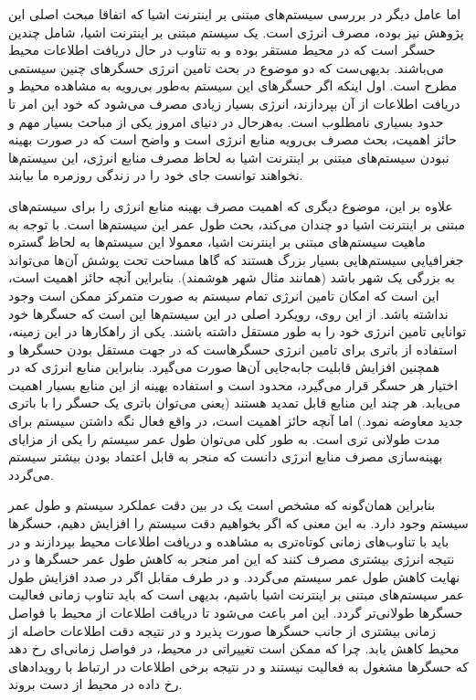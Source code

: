 \par
اما عامل دیگر در بررسی سیستم‌های مبتنی بر اینترنت اشیا که اتفاقا مبحث اصلی این پژوهش نیز بوده، مصرف انرژی است. یک سیستم مبتنی بر اینترنت اشیا، شامل چندین حسگر است که در محیط مستقر بوده و به تناوب در حال دریافت اطلاعات محیط می‌باشند. بدیهی‌ست که دو موضوع در بحث تامین انرژی حسگرهای چنین سیستمی مطرح است. اول اینکه اگر حسگرهای این سیستم به‌طور بی‌رویه به مشاهده محیط و دریافت اطلاعات از آن بپردازند، انرژی بسیار زیادی مصرف می‌شود که خود این امر تا حدود بسیاری نامطلوب است. به‌هرحال در دنیای امروز یکی از مباحث بسیار مهم و حائز اهمیت، بحث مصرف بی‌رویه منابع انرژی است و واضح است که در صورت بهینه نبودن سیستم‌های مبتنی بر اینترنت اشیا به لحاظ مصرف منابع انرژی، این سیستم‌ها نخواهند توانست جای خود را در زندگی روزمره ما بیابند.

\par
علاوه بر این، موضوع دیگری که اهمیت مصرف بهینه منابع انرژی را برای سیستم‌های مبتنی بر اینترنت اشیا دو چندان می‌کند، بحث طول عمر این سیستم‌ها است. با توجه به ماهیت سیستم‌های مبتنی بر اینترنت اشیا، معمولا این سیستم‌ها به لحاظ گستره جغرافیایی سیستم‌هایی بسیار بزرگ هستند که گاها مساحت تحت پوشش آن‌ها می‌تواند به بزرگی یک شهر باشد (همانند مثال شهر هوشمند). بنابراین آنچه حائز اهمیت است، این است که امکان تامین انرژی تمام سیستم به صورت متمرکز ممکن است وجود نداشته باشد. از این روی، رویکرد اصلی در این سیستم‌ها این است که حسگرها خود توانایی تامین انرژی خود را به طور مستقل داشته باشند. یکی از راهکارها در این زمینه، استفاده از باتری برای تامین انرژی حسگرهاست که در جهت مستقل بودن حسگرها و همچنین افزایش قابلیت جابه‌جایی آن‌ها صورت می‌گیرد. بنابراین منابع انرژی که در اختیار هر حسگر قرار می‌گیرد، محدود است و استفاده بهینه از این منابع بسیار اهمیت می‌یابد. هر چند این منابع قابل تمدید هستند (یعنی می‌توان باتری یک حسگر را با باتری جدید معاوضه نمود.) اما آنچه حائز اهمیت است، در واقع فعال نگه داشتن سیستم برای مدت طولانی تری است. به طور کلی می‌توان طول عمر سیستم را یکی از مزایای بهینه‌سازی مصرف منابع انرژی دانست که منجر به قابل اعتماد بودن بیشتر سیستم می‌گردد.

\par
بنابراین همان‌گونه که مشخص است یک  در بین دقت عملکرد سیستم و طول عمر سیستم وجود دارد. به این معنی که اگر بخواهیم دقت سیستم را افزایش دهیم، حسگرها باید با تناوب‌های زمانی کوتاه‌تری به مشاهده و دریافت اطلاعات محیط بپردازند و در نتیجه انرژی بیشتری مصرف کنند که این امر منجر به کاهش طول عمر حسگرها و در نهایت کاهش طول عمر سیستم می‌گردد. و در طرف مقابل اگر در صدد افزایش طول عمر سیستم‌های مبتنی بر اینترنت اشیا باشیم، بدیهی است که باید تناوب زمانی فعالیت حسگرها طولانی‌تر گردد. این امر باعث می‌شود تا دریافت اطلاعات از محیط با فواصل زمانی بیشتری از جانب حسگرها صورت پذیرد و در نتیجه دقت اطلاعات حاصله از محیط کاهش یابد. چرا که ممکن است تغییراتی در محیط، در فواصل زمانی‌ای رخ دهد که حسگرها مشغول به فعالیت نیستند و در نتیجه برخی اطلاعات در ارتباط با رویدادهای رخ داده در محیط از دست بروند.

